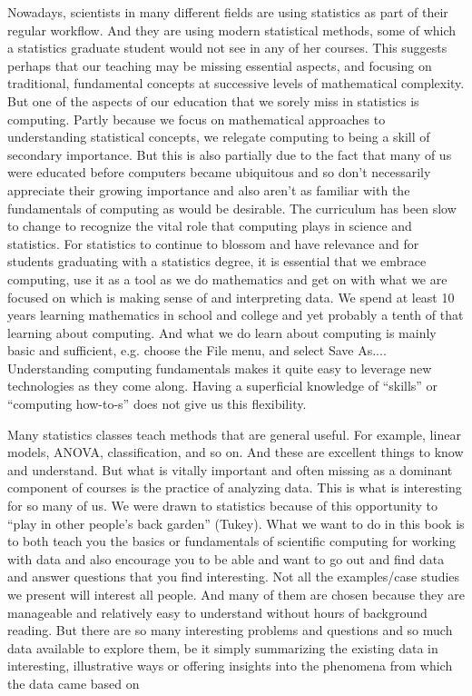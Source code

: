 Nowadays, scientists in many different fields are using statistics as
part of their regular workflow.  And they are using modern statistical
methods, some of which a statistics graduate student would not see in
any of her courses.  This suggests perhaps that our teaching may be
missing essential aspects, and focusing on traditional, fundamental
concepts at successive levels of mathematical complexity.  But one of
the aspects of our education that we sorely miss in statistics is
computing.  Partly because we focus on mathematical approaches to
understanding statistical concepts, we relegate computing to being a
skill of secondary importance. But this is also partially due to the
fact that many of us were educated before computers became ubiquitous
and so don't necessarily appreciate their growing importance and also
aren't as familiar with the fundamentals of computing as would be
desirable.  The curriculum has been slow to change to recognize the
vital role that computing plays in science and statistics.  For
statistics to continue to blossom and have relevance and for students
graduating with a statistics degree, it is essential that we embrace
computing, use it as a tool as we do mathematics and get on with what
we are focused on which is making sense of and interpreting data.  We
spend at least 10 years learning mathematics in school and college and
yet probably a tenth of that learning about computing.  And what we do
learn about computing is mainly basic and sufficient, e.g. choose the
File menu, and select Save As....  Understanding computing
fundamentals makes it quite easy to leverage new technologies as they
come along.  Having a superficial knowledge of ``skills'' or
``computing how-to-s'' does not give us this flexibility.


Many statistics classes teach methods that are general useful.  For
example, linear models, ANOVA, classification, and so on.  And these
are excellent things to know and understand. But what is vitally
important and often missing as a dominant component of courses is the
practice of analyzing data. This is what is interesting for so many of
us. We were drawn to statistics because of this opportunity to ``play
in other people's back garden'' (Tukey). What we want to do in this
book is to both teach you the basics or fundamentals of scientific
computing for working with data and also encourage you to be able and
want to go out and find data and answer questions that you find
interesting.  Not all the examples/case studies we present will
interest all people. And many of them are chosen because they are
manageable and relatively easy to understand without hours of
background reading.  But there are so many interesting problems and
questions and so much data available to explore them, be it simply
summarizing the existing data in interesting, illustrative ways or 
offering insights into the phenomena from which the data came based on 



